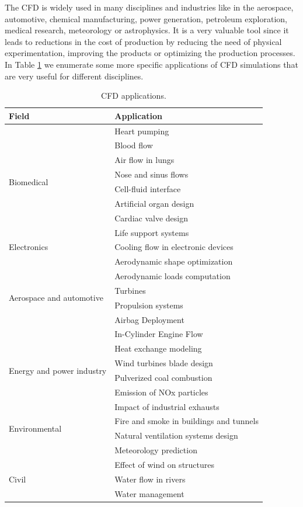 The CFD is widely used in many disciplines and industries like in the aerospace, automotive, chemical manufacturing, power generation, petroleum exploration, medical research, meteorology or astrophysics. It is a very valuable tool since it leads to reductions in the cost of production by reducing the need of physical experimentation, improving the products or optimizing the production processes. In Table \ref{table-CFD_applications} we enumerate some more specific applications of CFD simulations that are very useful for different disciplines.
\begin{table}[h]
\centering
\begin{tabular}{ll}
\toprule
Field&Application\\
\midrule
\midrule
\multirow{8}{*}{Biomedical}&Heart pumping\\
&Blood flow\\
&Air flow in lungs\\
&Nose and sinus flows\\
&Cell-fluid interface\\
&Artificial organ design\\
&Cardiac valve design\\
&Life support systems\\
\midrule
\multirow{1}{*}{Electronics}&Cooling flow in electronic devices\\
\midrule
\multirow{6}{*}{Aerospace and automotive}&Aerodynamic shape optimization\\
&Aerodynamic loads computation\\
&Turbines\\
&Propulsion systems\\
&Airbag Deployment\\
&In-Cylinder Engine Flow\\
\midrule
\multirow{4}{*}{Energy and power industry}&Heat exchange modeling\\
&Wind turbines blade design\\
&Pulverized coal combustion\\
&Emission of NOx particles\\
\midrule
\multirow{4}{*}{Environmental}&Impact of industrial exhausts\\
&Fire and smoke in buildings and tunnels\\
&Natural ventilation systems design\\
&Meteorology prediction\\
\midrule
\multirow{4}{*}{Civil}&Effect of wind on structures\\
&Water flow in rivers\\
&Water management\\
\bottomrule
\end{tabular}
\caption{CFD applications.}
\label{table-CFD_applications}
\end{table}

